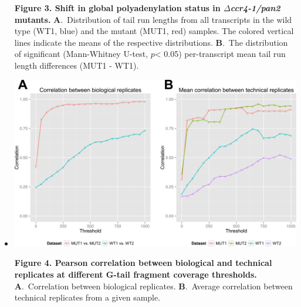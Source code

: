 \documentclass[10pt]{article}
\begin{document}
\begin{itemize}
{\textbf{Figure 3. Shift in global polyadenylation status in \textit{$\Delta$ccr4-1/pan2} mutants.} \textbf{A}.~Distribution of tail run lengths from all transcripts in the wild type (WT1, blue) and the mutant (MUT1, red) samples. The colored vertical lines indicate the means of the respective distributions.
\textbf{B}.~The distribution of significant (Mann-Whitney U-test, $p$< 0.05) per-transcript mean tail run length differences (MUT1 - WT1).
}



\item[]{
\includegraphics[scale=0.8]{Figure4.png}

\textbf{Figure 4. Pearson correlation between biological and technical replicates at different G-tail fragment coverage thresholds.} \textbf{A}.~Correlation between biological replicates.  \textbf{B}.~Average correlation between technical replicates from a given sample.}






\end{itemize}
\end{document}
